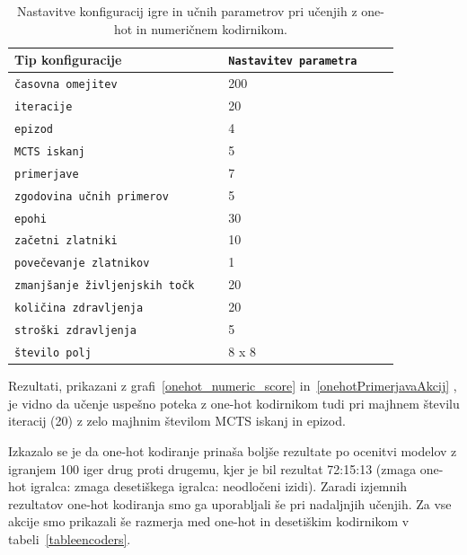 \documentclass[a4paper, 12pt]{book}
\begin{document}
\begin{table}
	\begin{center}
		\begin{tabular}{p{0.5\linewidth}|p{0.4\linewidth}}
			Tip konfiguracije                          & {\tt Nastavitev parametra} \\ \hline
			{\tt časovna omejitev}                     & 200                        \\
			{\tt iteracije}                            & 20                         \\
			{\tt epizod}                               & 4                          \\
			{\tt MCTS iskanj}                          & 5                          \\
			{\tt primerjave}                           & 7                          \\
			{\tt zgodovina učnih primerov}             & 5                          \\
			{\tt epohi}                                & 30                         \\
			{\tt začetni zlatniki}                     & 10                         \\
			{\tt povečevanje zlatnikov}                & 1                          \\
			{\tt zmanjšanje življenjskih točk}         & 20                         \\
			{\tt količina zdravljenja}                 & 20                         \\
			{\tt stroški zdravljenja}                  & 5                          \\
			{\tt število polj}                         & 8 x 8                      \\	
		\end{tabular}
	\end{center}
	\caption{Nastavitve konfiguracij igre in učnih parametrov pri učenjih z one-hot in numeričnem kodirnikom.}
	\label{tableCompareOneHotNumeric}
\end{table}

Rezultati, prikazani z grafi~\ref{onehot_numeric_score} in~\ref{onehotPrimerjavaAkcij} , je vidno da učenje uspešno poteka z one-hot kodirnikom tudi pri majhnem številu iteracij (20) z zelo majhnim številom MCTS iskanj in epizod.

Izkazalo se je da one-hot kodiranje prinaša boljše rezultate po ocenitvi modelov z igranjem 100 iger drug proti drugemu, kjer je bil rezultat 72:15:13 (zmaga one-hot igralca: zmaga desetiškega igralca: neodločeni izidi).
Zaradi izjemnih rezultatov one-hot kodiranja smo ga uporabljali še pri nadaljnjih učenjih.
Za vse akcije smo prikazali še razmerja med one-hot in desetiškim kodirnikom v tabeli~\ref{tableencoders}.
\end{document}
